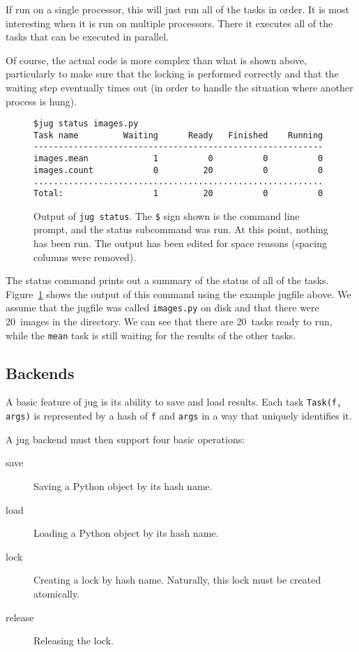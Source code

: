 \documentclass{article}
\let\code\texttt
\begin{document}
If run on a single processor, this will just run all of the tasks in order. It
is most interesting when it is run on multiple processors. There it executes
all of the tasks that can be executed in parallel.

Of course, the actual code is more complex than what is shown above,
particularly to make sure that the locking is performed correctly and that the
waiting step eventually times out (in order to handle the situation where
another process is hung).

\begin{figure}
\begin{verbatim}
$jug status images.py
Task name         Waiting      Ready   Finished    Running
----------------------------------------------------------
images.mean             1          0          0          0
images.count            0         20          0          0
..........................................................
Total:                  1         20          0          0
\end{verbatim}
\caption{Output of \code{jug status}. The \texttt{\$} sign shown is the command
line prompt, and the status subcommand was run. At this point, nothing has been
run. The output has been edited for space reasons (spacing columns were
removed).}
\label{fig:jug-status-output}
\end{figure}

The status command prints out a summary of the status of all of the tasks.
Figure~\ref{fig:jug-status-output} shows the output of this command using the
example jugfile above. We assume that the jugfile was called \code{images.py}
on disk and that there were 20~images in the directory. We can see that there
are 20~tasks ready to run, while the \code{mean} task is still waiting for the
results of the other tasks.
\subsection{Backends}

A basic feature of jug is its ability to save and load results. Each task
\code{Task(f, args)} is represented by a hash of \code{f} and \code{args} in a
way that uniquely identifies it.

A jug backend must then support four basic operations:

\begin{description}
\item[save] Saving a Python object by its hash name.
\item[load] Loading a Python object by its hash name.
\item[lock] Creating a lock by hash name. Naturally, this lock must be created
atomically.
\item[release] Releasing the lock.
\end{description}
\end{document}
